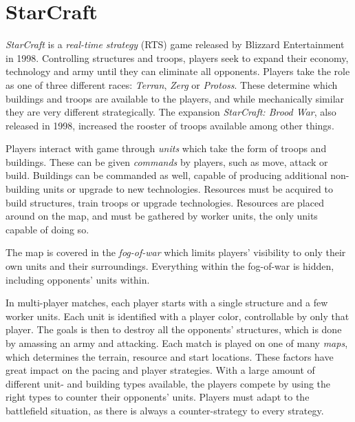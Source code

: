 \chapter{StarCraft}
\emph{StarCraft} is a \emph{real-time strategy} (RTS) game released by Blizzard Entertainment in 1998. Controlling structures and troops, players seek to expand their economy, technology and army until they can eliminate all opponents. Players take the role as one of three different races: \emph{Terran}, \emph{Zerg} or \emph{Protoss}. These determine which buildings and troops are available to the players, and while mechanically similar they are very different strategically. The expansion \emph{StarCraft: Brood War}, also released in 1998, increased the rooster of troops available among other things.

Players interact with game through \emph{units} which take the form of troops and buildings. These can be given \emph{commands} by players, such as move, attack or build. Buildings can be commanded as well, capable of producing additional non-building units or upgrade to new technologies. Resources must be acquired to build structures, train troops or upgrade technologies. Resources are placed around on the map, and must be gathered by worker units, the only units capable of doing so.

The map is covered in the \emph{fog-of-war} which limits players' visibility to only their own units and their surroundings. Everything within the fog-of-war is hidden, including opponents' units within.

In multi-player matches, each player starts with a single structure and a few worker units. Each unit is identified with a player color, controllable by only that player. The goals is then to destroy all the opponents' structures, which is done by amassing an army and attacking. Each match is played on one of many \emph{maps}, which determines the terrain, resource and start locations. These factors have great impact on the pacing and player strategies. With a large amount of different unit- and building types available, the players compete by using the right types to counter their opponents' units. Players must adapt to the battlefield situation, as there is always a counter-strategy to every strategy.